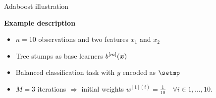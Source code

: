 \begin{vbframe}{Adaboost illustration}
\begin{footnotesize}

\textbf{Example description}

\begin{itemize}
  \item $n = 10$ observations and two features $x_1$ and $x_2$ 
  \item Tree stumps as base learners $b^{[m]}(\bm{x})$
  \item Balanced classification task with $y$ encoded as $\setmp$
  \item $M = 3$ iterations $\Rightarrow$ initial weights 
  $w^{[1](i)} = \frac{1}{10} \quad \forall i \in 1,\dots ,10$. 
\end{itemize}

\vfill


\end{footnotesize}
\end{vbframe}
